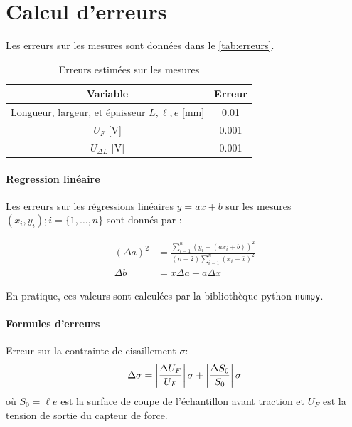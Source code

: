 \section{Calcul d'erreurs}
\label{sec:erreurs}

Les erreurs sur les mesures sont données dans le \autoref{tab:erreurs}.

\begin{table}[h]
    \centering
    \begin{tabulary}{\textwidth}{C C}
        \toprule
        Variable & Erreur \\
        \midrule
        Longueur, largeur, et épaisseur \(L, \ell, e\) [\si{\milli\meter}] & 0.01 \\
        \(U_F\) [\si{\volt}] & 0.001 \\
        \(U_{\Delta L}\) [\si{\volt}] & 0.001 \\
        \bottomrule
    \end{tabulary}
    \caption{Erreurs estimées sur les mesures}
    \label{tab:erreurs}
\end{table}

\paragraph*{Regression linéaire}
Les erreurs sur les régressions linéaires \(y = ax + b\) sur les mesures \((x_i, y_i) ; i = \{1, \dots, n\}\) sont donnés par \cite{erreursmesure}:

\begin{equation}
    \label{eq:erreur:fit}
    \begin{aligned}
        (\Delta a)^2 &= \frac{\sum_{i=1}^{n}(y_i - (a x_i + b))^2}{(n-2) \sum_{i=1}^{n}(x_i - \bar{x})^2}\\
        \Delta b &= \bar{x} \Delta a + a \Delta \bar{x}
    \end{aligned}
\end{equation}

En pratique, ces valeurs sont calculées par la bibliothèque python \texttt{numpy}.

\paragraph*{Formules d'erreurs}

Erreur sur la contrainte de cisaillement \(\sigma\):
\begin{equation}
    \Delta \sigma = \left|\frac{\Delta U_F}{U_F}\right| \sigma + \left|\frac{\Delta S_0}{S_0}\right| \sigma
\end{equation}
où \(S_0 = \ell e\) est la surface de coupe de l'échantillon avant traction et \(U_F\) est la tension de sortie du capteur de force.

